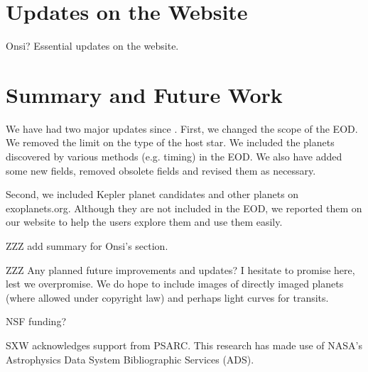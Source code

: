 \documentclass[11pt,preprint]{aastex}
\begin{document}
\begin{CJK*}{UTF8}{gbsn}
\section{Updates on the Website}\label{sec:website}

Onsi? Essential updates on the website.


\section{Summary and Future Work}\label{sec:summary}

We have had two major updates since \cite{Wright2011}. First, we
changed the scope of the EOD. We removed the limit on the type of the
host star. We included the planets discovered by various methods
(e.g. timing) in the EOD. We also have added some new fields, removed
obsolete fields and revised them as necessary.

Second, we included Kepler planet candidates and other planets on
exoplanets.org. Although they are not included in the EOD, we reported
them on our website to help the users explore them and use them
easily.

ZZZ add summary for Onsi's section.


ZZZ Any planned future improvements and updates?  I hesitate to
promise here, lest we overpromise.  We do hope to include images of
directly imaged planets (where allowed under copyright law) and
perhaps light curves for transits.


\acknowledgments

NSF funding?

SXW acknowledges support from PSARC. This research has made use of
NASA's Astrophysics Data System Bibliographic Services (ADS). 





\clearpage


\end{CJK*}
\end{document}
